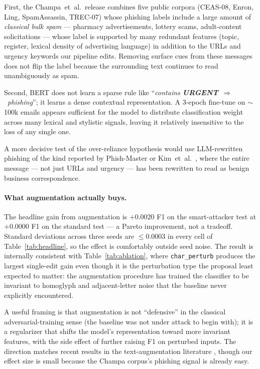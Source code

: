 \documentclass[conference]{IEEEtran}
\begin{document}
First, the Champa~et~al.\ release combines five public corpora
(CEAS-08, Enron, Ling, SpamAssassin, TREC-07) whose phishing labels include
a large amount of \emph{classical bulk spam} --- pharmacy advertisements,
lottery scams, adult-content solicitations --- whose label is supported by
many redundant features (topic, register, lexical density of advertising
language) in addition to the URLs and urgency keywords our pipeline edits.
Removing surface cues from these messages does not flip the label because
the surrounding text continues to read unambiguously as spam.

Second, BERT does not learn a sparse rule like ``\textit{contains
\textbf{URGENT}}~$\Rightarrow$~\textit{phishing}''; it learns a dense
contextual representation. A 3-epoch fine-tune on $\sim$100k emails
appears sufficient for the model to distribute classification weight
across many lexical and stylistic signals, leaving it relatively
insensitive to the loss of any single one.

A more decisive test of the over-reliance hypothesis would use
LLM-rewritten phishing of the kind reported by Phish-Master
\cite{phishmaster2025} or Kim~et~al.~\cite{kim2025llms}, where the entire
message --- not just URLs and urgency --- has been rewritten to read as
benign business correspondence.

\paragraph{What augmentation actually buys.} The headline gain from
augmentation is $+0.0020$ F1 on the smart-attacker test at $+0.0000$ F1
on the standard test --- a Pareto improvement, not a tradeoff. Standard
deviations across three seeds are $\le 0.0003$ in every cell of
Table~\ref{tab:headline}, so the effect is comfortably outside seed noise.
The result is internally consistent with Table~\ref{tab:ablation}, where
\texttt{char\_perturb} produces the largest single-edit gain even though
it is the perturbation type the proposal least expected to matter: the
augmentation procedure has trained the classifier to be invariant to
homoglyph and adjacent-letter noise that the baseline never explicitly
encountered.

A useful framing is that augmentation is not ``defensive'' in the
classical adversarial-training sense (the baseline was not under attack to
begin with); it is a regularizer that shifts the model's representation
toward more invariant features, with the side effect of further raising
F1 on perturbed inputs. The direction matches recent results in the
text-augmentation literature
\cite{textaugsurvey2025,explainabletransformer2025,robustllmphish2025},
though our effect size is small because the Champa corpus's phishing
signal is already easy.
\end{document}
